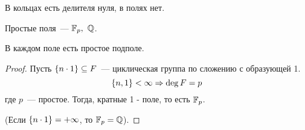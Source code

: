 \begin{corollary}
  В кольцах есть делителя нуля, в полях нет.
\end{corollary}

\begin{example}
  Простые поля~--- $\mathbb{F}_p, \ \mathbb{Q}$.
\end{example}

\begin{lemma}
  В каждом поле есть простое подполе.
\end{lemma}

\begin{proof}
  Пусть $\{ n \cdot 1 \} \subseteq F$~--- циклическая группа по сложению с образующей 1. 
  \[\{n, 1\} < \infty \Rightarrow \deg F = p\]
  где $p$~--- простое. Тогда, кратные 1 - поле, то есть $\mathbb{F}_p$.

  (Если $\{n \cdot 1\} = + \infty$, то $\mathbb{F}_p = \mathbb{Q}$).
\end{proof}